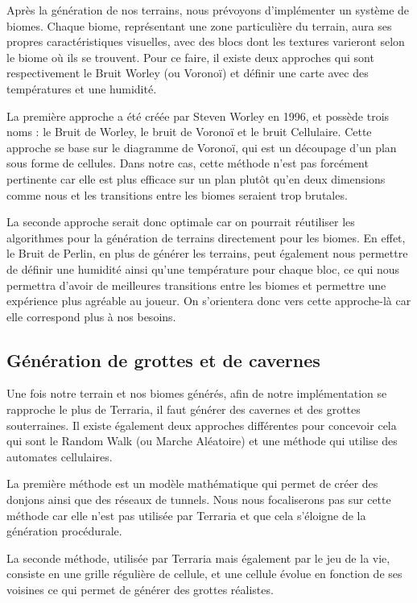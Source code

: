 \documentclass{article}
\begin{document}
Après la génération de nos terrains, nous prévoyons d'implémenter un système de biomes. Chaque biome, représentant une zone particulière du terrain, aura ses propres caractéristiques visuelles, avec des blocs dont les textures varieront selon le biome où ils se trouvent. Pour ce faire, il existe deux approches qui sont respectivement le Bruit Worley (ou Voronoï) et définir une carte avec des températures et une humidité.\par
La première approche a été créée par Steven Worley en 1996, et possède trois noms : le Bruit de Worley, le bruit de Voronoï et le bruit Cellulaire. Cette approche se base sur le diagramme de Voronoï, qui est un découpage d'un plan sous forme de cellules. Dans notre cas, cette méthode n'est pas forcément pertinente car elle est plus efficace sur un plan plutôt qu'en deux dimensions comme nous et les transitions entre les biomes seraient trop brutales.\par
La seconde approche serait donc optimale car on pourrait réutiliser les algorithmes pour la génération de terrains directement pour les biomes. En effet, le Bruit de Perlin, en plus de générer les terrains, peut également nous permettre de définir une humidité ainsi qu'une température pour chaque bloc, ce qui nous permettra d'avoir de meilleures transitions entre les biomes et permettre une expérience plus agréable au joueur. On s'orientera donc vers cette approche-là car elle correspond plus à nos besoins. 

\subsection{Génération de grottes et de cavernes}
Une fois notre terrain et nos biomes générés, afin de notre implémentation se rapproche le plus de Terraria, il faut générer des cavernes et des grottes souterraines. Il existe également deux approches différentes pour concevoir cela qui sont le Random Walk (ou Marche Aléatoire) et une méthode qui utilise des automates cellulaires.\par
La première méthode est un modèle mathématique qui permet de créer des donjons ainsi que des réseaux de tunnels. Nous nous focaliserons pas sur cette méthode car elle n'est pas utilisée par Terraria et que cela s'éloigne de la génération procédurale.\par 
La seconde méthode, utilisée par Terraria mais également par le jeu de la vie, consiste en une grille régulière de cellule, et une cellule évolue en fonction de ses voisines ce qui permet de générer des grottes réalistes.
\end{document}

